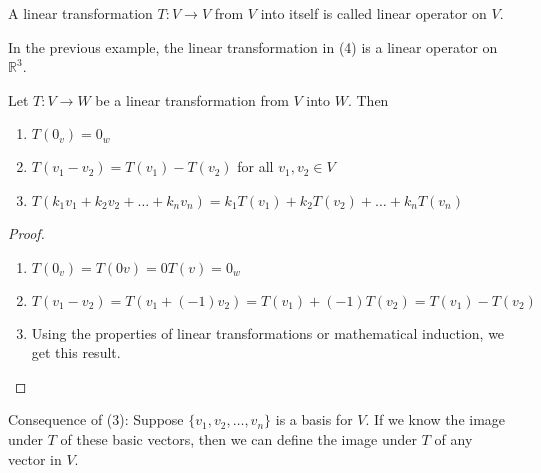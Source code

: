 \documentclass[12pt]{article}
\begin{document}
\begin{definition} A linear transformation $T: V \to V$ from $V$ into itself is called linear operator on $V$. \end{definition} 
 In the previous example, the linear transformation in (4)  is a linear operator on $\mathbb{R}^3$. 
 \begin{theorem} Let $T: V \to W$ be a linear transformation from $V$ into $W$. Then \begin{enumerate} 
 \item $T(0_v) = 0_w $ \item $T(v_1 - v_2) = T(v_1) - T(v_2) $ for all $v_1, v_2 \in V$ \item $T(k_1v_1 + k_2v_2 + \dots + k_nv_n) = k_1T(v_1) + k_2T(v_2) + \dots + k_nT(v_n)$ \end{enumerate} \end{theorem} 
 \begin{proof} \begin{enumerate} \item $T(0_v) = T(0v) = 0T(v) = 0_w$ \item $T(v_1 - v_2) = T(v_1 + (-1)v_2) = T(v_1) + (-1)T(v_2) = T(v_1) - T(v_2) $
 \item Using the properties of linear transformations or mathematical induction, we get this result. \end{enumerate} \end{proof} 
 Consequence of (3): Suppose $\{v_1, v_2, \dots, v_n\}$ is a basis for $V$. If we know the image under $T$ of these basic vectors, then we can define the image under $T$ of any vector in $V$. 
\end{document}
